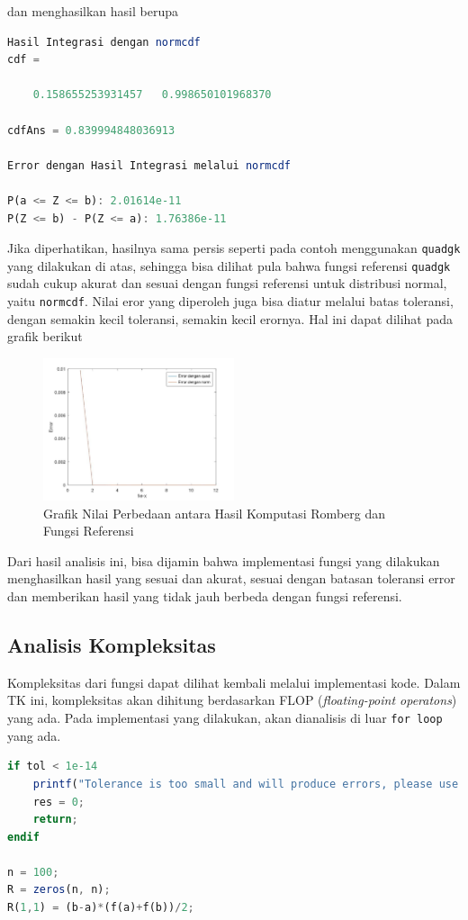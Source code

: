 \documentclass[journal,12pt,onecolumn,a4paper]{IEEEtran}
\begin{document}
dan menghasilkan hasil berupa

\begin{center}
	\begin{lstlisting}[language=Octave]
Hasil Integrasi dengan normcdf
cdf =

	0.158655253931457   0.998650101968370

cdfAns = 0.839994848036913

Error dengan Hasil Integrasi melalui normcdf

P(a <= Z <= b): 2.01614e-11
P(Z <= b) - P(Z <= a): 1.76386e-11
	\end{lstlisting}
\end{center}

Jika diperhatikan, hasilnya sama persis seperti pada contoh menggunakan \lstinline{quadgk} yang dilakukan di atas, sehingga bisa dilihat pula bahwa fungsi referensi \lstinline{quadgk} sudah cukup akurat dan sesuai dengan fungsi referensi untuk distribusi normal, yaitu \lstinline{normcdf}.
Nilai eror yang diperoleh juga bisa diatur melalui batas toleransi, dengan semakin kecil toleransi, semakin kecil erornya. Hal ini dapat dilihat pada grafik berikut
\begin{figure}[h]
	\centering
	\includegraphics[width=0.5\textwidth]{quadnorm_romberg}
	\caption{Grafik Nilai Perbedaan antara Hasil Komputasi Romberg dan Fungsi Referensi}
	\label{fig:difGraph}
\end{figure}

Dari hasil analisis ini, bisa dijamin bahwa implementasi fungsi yang dilakukan menghasilkan hasil yang sesuai dan akurat, sesuai dengan batasan toleransi error dan memberikan hasil yang tidak jauh berbeda dengan fungsi referensi.

\subsection{Analisis Kompleksitas}
Kompleksitas dari fungsi dapat dilihat kembali melalui implementasi kode. Dalam TK ini, kompleksitas akan dihitung berdasarkan FLOP (\emph{floating-point operatons}) yang ada.
Pada implementasi yang dilakukan, akan dianalisis di luar \lstinline{for loop} yang ada.
\begin{center}
	\begin{lstlisting}[language=Octave]
if tol < 1e-14
	printf("Tolerance is too small and will produce errors, please use larger values\n")
	res = 0;
	return;
endif

n = 100;
R = zeros(n, n);
R(1,1) = (b-a)*(f(a)+f(b))/2;
	\end{lstlisting}
\end{center}
\end{document}

